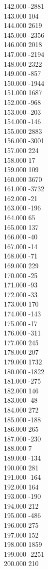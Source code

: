 { 142.000	-2881 \\
 143.000	104 \\
 144.000	2619 \\
 145.000	-2356 \\
 146.000	2018 \\
 147.000	-2194 \\
 148.000	2322 \\
 149.000	-857 \\
 150.000	-1944 \\
 151.000	1687 \\
 152.000	-968 \\
 153.000	-203 \\
 154.000	-146 \\
 155.000	2883 \\
 156.000	-3001 \\
 157.000	224 \\
 158.000	17 \\
 159.000	109 \\
 160.000	3670 \\
 161.000	-3732 \\
 162.000	-21 \\
 163.000	-196 \\
 164.000	65 \\
 165.000	137 \\
 166.000	-40 \\
 167.000	-14 \\
 168.000	-71 \\
 169.000	229 \\
 170.000	-25 \\
 171.000	-93 \\
 172.000	-33 \\
 173.000	170 \\
 174.000	-143 \\
 175.000	-17 \\
 176.000	-311 \\
 177.000	245 \\
 178.000	207 \\
 179.000	1732 \\
 180.000	-1822 \\
 181.000	-275 \\
 182.000	146 \\
 183.000	-48 \\
 184.000	272 \\
 185.000	-188 \\
 186.000	265 \\
 187.000	-230 \\
 188.000	7 \\
 189.000	-134 \\
 190.000	281 \\
 191.000	-164 \\
 192.000	164 \\
 193.000	-190 \\
 194.000	212 \\
 195.000	-486 \\
 196.000	275 \\
 197.000	152 \\
 198.000	1859 \\
 199.000	-2251 \\
 200.000	210 \\
}
